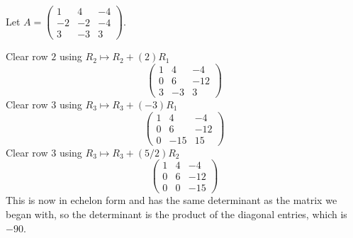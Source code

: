 \documentclass{article}
\begin{document}
\begin{Example}
Let \(A=\begin{pmatrix} 1 & 4 & -4 \\ -2 & -2 & -4 \\ 3 & -3 & 3
\end{pmatrix}\).


Clear row \(2\) using \(R_2\mapsto R_2+(2)R_1\)\[\begin{pmatrix} 1 &
4 & -4 \\ 0 & 6 & -12 \\ 3 & -3 & 3 \end{pmatrix}\] Clear row \(3\)
using \(R_3\mapsto R_3+(-3)R_1\)\[\begin{pmatrix} 1 & 4 & -4 \\ 0 &
6 & -12 \\ 0 & -15 & 15 \end{pmatrix}\] Clear row \(3\) using
\(R_3\mapsto R_3+(5/2)R_2\)\[\begin{pmatrix} 1 & 4 & -4 \\ 0 & 6 &
-12 \\ 0 & 0 & -15 \end{pmatrix}\] This is now in echelon form and
has the same determinant as the matrix we began with, so the
determinant is the product of the diagonal entries, which is
\(-90\).


\end{Example}
\end{document}
